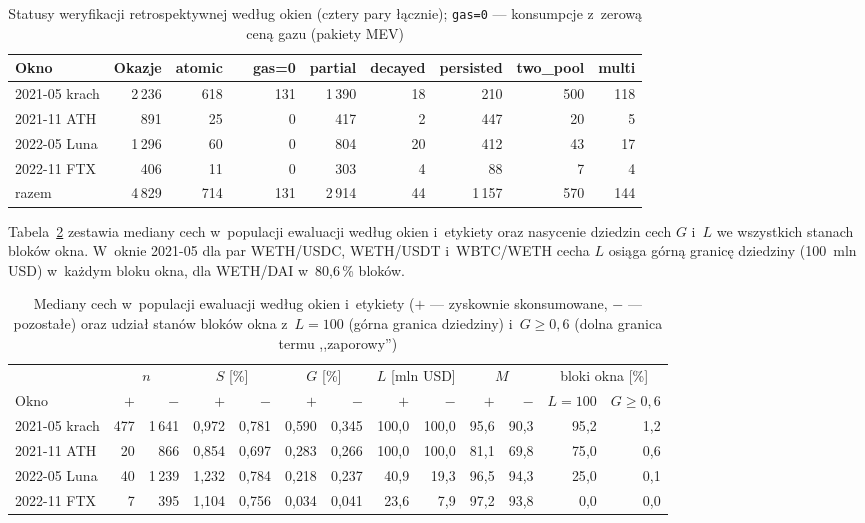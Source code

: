 \begin{table}[H]\centering\footnotesize
\caption{Statusy weryfikacji retrospektywnej według okien (cztery pary łącznie);
  \texttt{gas=0} --- konsumpcje z~zerową ceną gazu (pakiety MEV)}\label{tab:verif}
\begin{tabular}{lrrrrrrrr}
\toprule
Okno & Okazje & atomic & \ \ gas=0 & partial & decayed & persisted & two\_pool & multi \\
\midrule
2021-05 krach & 2\,236 & 618 & 131 & 1\,390 & 18 & 210 & 500 & 118 \\
2021-11 ATH   & 891   & 25  & 0   & 417   & 2  & 447 & 20  & 5   \\
2022-05 Luna  & 1\,296 & 60  & 0   & 804   & 20 & 412 & 43  & 17  \\
2022-11 FTX   & 406   & 11  & 0   & 303   & 4  & 88  & 7   & 4   \\
\midrule
razem         & 4\,829 & 714 & 131 & 2\,914 & 44 & 1\,157 & 570 & 144 \\
\bottomrule
\end{tabular}
\end{table}

Tabela~\ref{tab:features-label} zestawia mediany cech w~populacji ewaluacji według okien i~etykiety oraz
nasycenie dziedzin cech $G$ i~$L$ we wszystkich stanach bloków okna. W~oknie 2021-05 dla par
WETH/USDC, WETH/USDT i~WBTC/WETH cecha $L$ osiąga górną granicę dziedziny (100~mln USD) w~każdym
bloku okna, dla WETH/DAI w~80,6\,\% bloków.

\begin{table}[H]\centering\scriptsize\setlength{\tabcolsep}{3pt}
\caption{Mediany cech w~populacji ewaluacji według okien i~etykiety ($+$ --- zyskownie skonsumowane,
  $-$ --- pozostałe) oraz udział stanów bloków okna z~$L=100$ (górna granica dziedziny)
  i~$G\ge0{,}6$ (dolna granica termu ,,zaporowy'')}\label{tab:features-label}
\begin{tabular}{lrrrrrrrrrrrr}
\toprule
 & \multicolumn{2}{c}{$n$} & \multicolumn{2}{c}{$S$ [\%]} & \multicolumn{2}{c}{$G$ [\%]} & \multicolumn{2}{c}{$L$ [mln USD]} & \multicolumn{2}{c}{$M$} & \multicolumn{2}{c}{bloki okna [\%]} \\
\cmidrule(lr){2-3}\cmidrule(lr){4-5}\cmidrule(lr){6-7}\cmidrule(lr){8-9}\cmidrule(lr){10-11}\cmidrule(lr){12-13}
Okno & $+$ & $-$ & $+$ & $-$ & $+$ & $-$ & $+$ & $-$ & $+$ & $-$ & $L{=}100$ & $G{\ge}0{,}6$ \\
\midrule
2021-05 krach & 477 & 1\,641 & 0{,}972 & 0{,}781 & 0{,}590 & 0{,}345 & 100{,}0 & 100{,}0 & 95{,}6 & 90{,}3 & 95{,}2 & 1{,}2 \\
2021-11 ATH   & 20  & 866    & 0{,}854 & 0{,}697 & 0{,}283 & 0{,}266 & 100{,}0 & 100{,}0 & 81{,}1 & 69{,}8 & 75{,}0 & 0{,}6 \\
2022-05 Luna  & 40  & 1\,239 & 1{,}232 & 0{,}784 & 0{,}218 & 0{,}237 & 40{,}9  & 19{,}3  & 96{,}5 & 94{,}3 & 25{,}0 & 0{,}1 \\
2022-11 FTX   & 7   & 395    & 1{,}104 & 0{,}756 & 0{,}034 & 0{,}041 & 23{,}6  & 7{,}9   & 97{,}2 & 93{,}8 & 0{,}0  & 0{,}0 \\
\bottomrule
\end{tabular}
\end{table}


